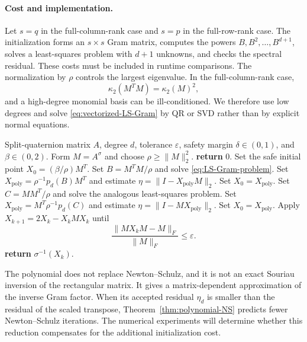 \documentclass[12pt,a4paper]{article}
\theoremstyle{plain}
\theoremstyle{definition}
\theoremstyle{remark}
\begin{document}
\paragraph{Cost and implementation.}
Let $s=q$ in the full-column-rank case and $s=p$ in the full-row-rank case.  The initialization forms an $s\times s$ Gram matrix, computes the powers $B, B^2, \ldots, B^{d+1}$, solves a least-squares problem with $d+1$ unknowns, and checks the spectral residual.  These costs must be included in runtime comparisons.  The normalization by $\rho$ controls the largest eigenvalue. In the full-column-rank case,
\[
    \kappa_2(M^TM)=\kappa_2(M)^2,
\]
and a high-degree monomial basis can be ill-conditioned.  We therefore use low degrees and solve \eqref{eq:vectorized-LS-Gram} by QR or SVD rather than by explicit normal equations.

\begin{algorithm}[H]
\caption{LS--Gram initialized Newton--Schulz}
\label{alg:souriau-poly-ns}
\begin{algorithmic}[1]
\REQUIRE Split-quaternion matrix $A$, degree $d$, tolerance $\varepsilon$, safety margin $\delta\in(0,1)$, and $\beta\in(0,2)$.
\STATE Form $M=A^\sigma$ and choose $\rho\geq\|M\|_2^2$.
    \STATE \textbf{return} $0$.
\ENDIF
\STATE Set the safe initial point $X_0=(\beta/\rho)M^T$.
    \STATE Set $B=M^TM/\rho$ and solve \eqref{eq:LS-Gram-problem}.
    \STATE Set $X_{\mathrm{poly}}=\rho^{-1}p_d(B)M^T$ and estimate $\eta=\|I-X_{\mathrm{poly}}M\|_2$.
        \STATE Set $X_0=X_{\mathrm{poly}}$.
    \ENDIF
{}
    \STATE Set $C=MM^T/\rho$ and solve the analogous least-squares problem.
    \STATE Set $X_{\mathrm{poly}}=M^T\rho^{-1}p_d(C)$ and estimate $\eta=\|I-MX_{\mathrm{poly}}\|_2$.
        \STATE Set $X_0=X_{\mathrm{poly}}$.
    \ENDIF
\ENDIF
\STATE Apply $X_{k+1}=2X_k-X_kMX_k$ until
\[
    \frac{\|MX_kM-M\|_F}{\|M\|_F}\leq\varepsilon.
\]
\STATE \textbf{return} \(\sigma^{-1}(X_k)\).
\end{algorithmic}
\end{algorithm}

The polynomial does not replace Newton--Schulz, and it is not an exact Souriau inversion of the rectangular matrix.  It gives a matrix-dependent approximation of the inverse Gram factor.  When its accepted residual $\eta_d$ is smaller than the residual of the scaled transpose, Theorem~\ref{thm:polynomial-NS} predicts fewer Newton--Schulz iterations.  The numerical experiments will determine whether this reduction compensates for the additional initialization cost.
\end{document}
